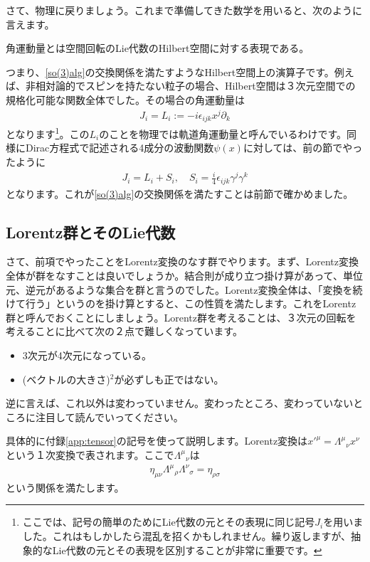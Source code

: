 \documentclass[report,paper=a4, fontsize=12pt, line_length=16cm, number_of_lines=33,dvipdfmx]{jlreq}
\newenvironment{myquote}{\begin{tcolorbox}[
  colback = blue!5, after = \noindent] }{\end{tcolorbox}}
\numberwithin{equation}{chapter}
\newcommand{\del}{\partial}
\begin{document}
さて、物理に戻りましょう。これまで準備してきた数学を用いると、次のように言えます。
\begin{myquote}
  角運動量とは空間回転のLie代数のHilbert空間に対する表現である。
\end{myquote}
つまり、\eqref{so(3)alg}の交換関係を満たすようなHilbert空間上の演算子です。例えば、非相対論的でスピンを持たない粒子の場合、Hilbert空間は３次元空間での規格化可能な関数全体でした。その場合の角運動量は
\begin{align}
  J_i=L_i:=-i\epsilon_{ijk}x^j\del_{k}
\end{align}
となります\footnote{ここでは、記号の簡単のためにLie代数の元とその表現に同じ記号$J_i$を用いました。これはもしかしたら混乱を招くかもしれません。繰り返しますが、抽象的なLie代数の元とその表現を区別することが非常に重要です。}。この$L_i$のことを物理では軌道角運動量と呼んでいるわけです。同様にDirac方程式で記述される4成分の波動関数$\psi(x)$に対しては、前の節でやったように
\begin{align}
  J_i=L_i+S_i,\quad S_i=\frac{i}{4}\epsilon_{ijk}\gamma^{j}\gamma^{k}\label{3dangularmomentum}
\end{align}
となります。これが\eqref{so(3)alg}の交換関係を満たすことは前節で確かめました。

\subsection{Lorentz群とそのLie代数}
さて、前項でやったことをLorentz変換のなす群でやります。まず、Lorentz変換全体が群をなすことは良いでしょうか。結合則が成り立つ掛け算があって、単位元、逆元があるような集合を群と言うのでした。Lorentz変換全体は、「変換を続けて行う」というのを掛け算とすると、この性質を満たします。これをLorentz群と呼んでおくことにしましょう。Lorentz群を考えることは、３次元の回転を考えることに比べて次の２点で難しくなっています。
\begin{itemize}
  \item 3次元が4次元になっている。
  \item (ベクトルの大きさ)${}^2$が必ずしも正ではない。
\end{itemize}
逆に言えば、これ以外は変わっていません。変わったところ、変わっていないところに注目して読んでいってください。

具体的に付録\ref{app:tensor}の記号を使って説明します。Lorentz変換は$x'^{\mu}=\Lambda^{\mu}{}_{\nu}x^{\nu}$という１次変換で表されます。ここで$\Lambda^{\mu}{}_{\nu}$は
\begin{align}
  \eta_{\mu\nu}\Lambda^{\mu}{}_{\rho}\Lambda^{\nu}{}_{\sigma}=\eta_{\rho\sigma}
  \label{Lorentztransf1}
\end{align}
という関係を満たします。
\end{document}
